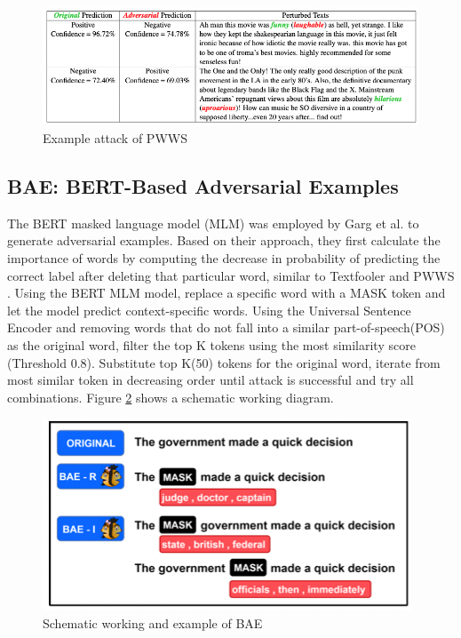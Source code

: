 \documentclass[%
	BCOR=8mm, %
	DIV=12,
	toc=bibliography, %
	toc=listof, %
	oneside, %
	egregdoesnotlikesansseriftitles, %
	]{scrbook}
\begin{document}
\begin{figure}[h!]
    \centering
    \includegraphics[width=.8\textwidth]{img/PWWSexample.png}
    \caption[Example of PWWS attack recipe]{Example attack of PWWS\cite{ren_generating_2019} }
    \label{diag:pwwsexp}
\end{figure}

\subsection{BAE: BERT-Based Adversarial Examples}
\label{subsection:bae}
The BERT masked language model (MLM) was employed by Garg et al. \cite{garg_bae_2020}  to generate adversarial examples. Based on their approach, they first calculate the importance of words by computing the decrease in probability of predicting the correct label after deleting that particular word, similar to Textfooler \cite{jia_certified_2019}  and PWWS \cite{ren_generating_2019}. Using the BERT MLM model, replace a specific word with a MASK token and let the model predict context-specific words. Using the Universal Sentence Encoder \cite{cer_universal_2018} and removing words that do not fall into a similar part-of-speech(POS) as the original word, filter the top K tokens using the most similarity score (Threshold 0.8). Substitute top K(50) tokens for the original word, iterate from most similar token in decreasing order until attack is successful and try all combinations. Figure \ref{diag:baeexp} shows a schematic working diagram.
\begin{figure}[H]
    \centering
    \includegraphics[width=.5\textwidth]{img/BAEexample.png}
    \caption[Schematic working and example of BAE attack recipe]{Schematic working and example of BAE\cite{garg_bae_2020} }
    \label{diag:baeexp}
\end{figure}
\end{document}
